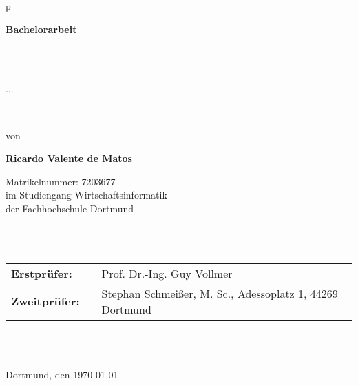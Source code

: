 \begin{center}
	\begin{tabular}{p{\textwidth}}
		
		\begin{center}
			\textbf{\Large{Bachelorarbeit}}
		\end{center} \\ \\
		
		\begin{center}
			\LARGE{\textsc{
					...
			}}
		\end{center}
		
		\\
		
		
		
		\begin{center}
			von
		\end{center}
		
		\begin{center}
			\large{\textbf{Ricardo Valente de Matos}}
		\end{center}
	
	\begin{center}
		\large{Matrikelnummer: 7203677} \\
		\large{im Studiengang Wirtschaftsinformatik \\
			der Fachhochschule Dortmund \\}
	\end{center}
		
		
		\\
		
		\\
		
		\begin{center}
			\begin{tabular}{lll}
				\textbf{Erstprüfer:} & & Prof. Dr.-Ing. Guy Vollmer\\
				\textbf{Zweitprüfer:} & & Stephan Schmeißer, M. Sc., Adessoplatz 1, 44269 Dortmund\\
			\end{tabular}
		\end{center}
	
	\\ \\
	
	\begin{center}
		\large{Dortmund, den \today}
	\end{center}
		
	\end{tabular}
\end{center}